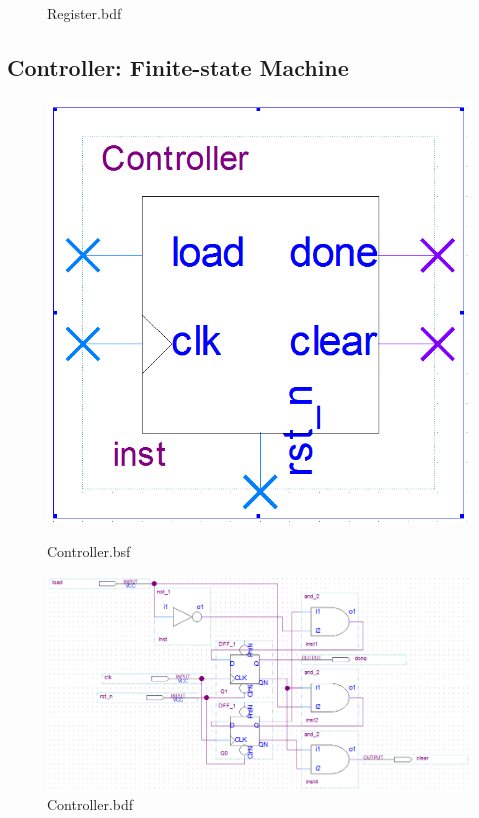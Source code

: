 \documentclass[12pt,a4paper]{article}
\begin{document}
\begin{figure}[H]
\begin{subcaptionblock}{0.8\linewidth}
      \caption{Register.bdf}
    \end{subcaptionblock}
  \end{figure}

  \subsection{Controller: Finite-state Machine}
  \begin{figure}[H]
    \centering
    \begin{subcaptionblock}{0.19\linewidth}
      \includegraphics[width=\linewidth]{Lab2_3/Controller_bsf.png}
      \caption{Controller.bsf}
    \end{subcaptionblock}
    \begin{subcaptionblock}{0.8\linewidth}
      \includegraphics[width=\linewidth]{Lab2_3/Controller_bdf.png}
      \caption{Controller.bdf}
    \end{subcaptionblock}
  \end{figure}
\end{document}
